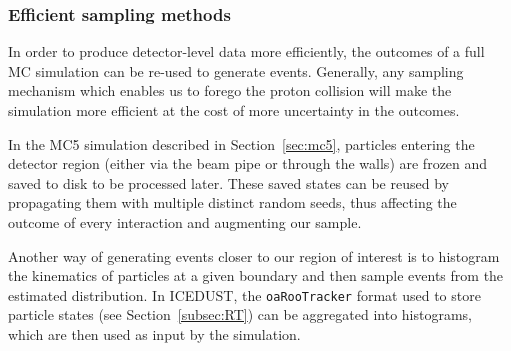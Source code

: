 


\subsubsection{Efficient sampling methods}
In order to produce detector-level data more efficiently, the outcomes of a full
MC simulation can be re-used to generate events. Generally, any sampling
mechanism which enables us to forego the proton collision will make the
simulation more efficient at the cost of more uncertainty in the outcomes.

In the MC5 simulation described in Section~\ref{sec:mc5}, particles
entering the detector region (either via the beam pipe or through the walls) are
frozen and saved to disk to be processed later. These saved states can be reused
by propagating them with multiple distinct random seeds, thus affecting the outcome
of every interaction and augmenting our sample.

Another way of generating events closer to our region of interest is to
histogram the kinematics of particles at a given boundary and then sample events
from the estimated distribution. In ICEDUST, the \texttt{oaRooTracker} format
used to store particle states (see Section~\ref{subsec:RT}) can be aggregated
into histograms, which are then used as input by the simulation.



